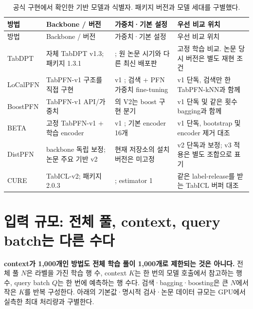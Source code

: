 \begin{longtable}{L{.13\linewidth}L{.25\linewidth}L{.25\linewidth}L{.27\linewidth}}
\caption{공식 구현에서 확인한 기반 모델과 식별자. 패키지 버전과 모델 세대를 구별했다.}\\
\toprule 방법 & Backbone / 버전 & 가중치·기본 설정 & 우선 비교 위치\\\midrule\endfirsthead
\toprule 방법 & Backbone / 버전 & 가중치·기본 설정 & 우선 비교 위치\\\midrule\endhead
TabDPT & 자체 TabDPT v1.3; 패키지 1.3.1 & ; 원 논문 시기와 다른 최신 배포판 & 고정 학습 비교. 논문 당시 버전은 별도 재현 조건\\
LoCalPFN & TabPFN-v1 구조를 직접 구현 & v1 ; 검색 + PFN 가중치 fine-tuning & v1 단독, 검색만 한 TabPFN-kNN과 함께\\
BoostPFN & TabPFN-v1 API/가중치 & 의 V2는 boost 구현 분기 & v1 단독 및 같은 횟수 bagging과 함께\\
BETA & 고정 TabPFN-v1 + 학습 encoder & v1 ; 기본 encoder 16개 & v1 단독, bootstrap 및 encoder 제거 대조\\
DistPFN & backbone 독립 보정; 논문 주요 기반 v2 & 현재 저장소의  설치 버전은 미고정 & v2 단독과 보정; v3 적용은 별도 조합으로 표기\\
CURE & TabICL-v2; 패키지 2.0.3 & ; estimator 1 & 같은 label-release를 받는 TabICL 버퍼 대조\\
\bottomrule
\end{longtable}
\normalsize

\clearpage
\section{입력 규모: 전체 풀, context, query batch는 다른 수다}
\textbf{context가 1,000개인 방법도 전체 학습 풀이 1,000개로 제한되는 것은 아니다.} 전체 풀 $N$은 라벨을 가진 학습 행 수, context $K$는 한 번의 모델 호출에서 참고하는 행 수, query batch $Q$는 한 번에 예측하는 행 수다. 검색·bagging·boosting은 큰 $N$에서 작은 $K$를 반복 구성한다. 아래의 기본값·명시적 검사·논문 데이터 규모는 GPU에서 실측한 최대 처리량과 구별한다.

